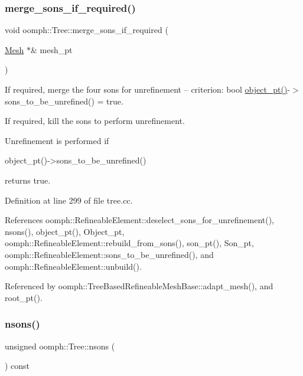 \subsubsection{\texorpdfstring{merge\+\_\+sons\+\_\+if\+\_\+required()}{merge\_sons\_if\_required()}}
{\footnotesize\ttfamily void oomph\+::\+Tree\+::merge\+\_\+sons\+\_\+if\+\_\+required (\begin{DoxyParamCaption}\item[{\hyperlink{classoomph_1_1Mesh}{Mesh} $\ast$\&}]{mesh\+\_\+pt }\end{DoxyParamCaption})}



If required, merge the four sons for unrefinement -- criterion\+: bool \hyperlink{classoomph_1_1Tree_a2f2eeb0f1dd161f696cccc652974ff4c}{object\+\_\+pt()}-\/$>$ sons\+\_\+to\+\_\+be\+\_\+unrefined() = true. 

If required, kill the sons to perform unrefinement.

Unrefinement is performed if \begin{DoxyVerb} object_pt()->sons_to_be_unrefined()
\end{DoxyVerb}


returns true. 

Definition at line 299 of file tree.\+cc.



References oomph\+::\+Refineable\+Element\+::deselect\+\_\+sons\+\_\+for\+\_\+unrefinement(), nsons(), object\+\_\+pt(), Object\+\_\+pt, oomph\+::\+Refineable\+Element\+::rebuild\+\_\+from\+\_\+sons(), son\+\_\+pt(), Son\+\_\+pt, oomph\+::\+Refineable\+Element\+::sons\+\_\+to\+\_\+be\+\_\+unrefined(), and oomph\+::\+Refineable\+Element\+::unbuild().



Referenced by oomph\+::\+Tree\+Based\+Refineable\+Mesh\+Base\+::adapt\+\_\+mesh(), and root\+\_\+pt().

\mbox{\label{classoomph_1_1Tree_a31e4123b40f6fb52d180a154c9123e85}} 
\subsubsection{\texorpdfstring{nsons()}{nsons()}}
{\footnotesize\ttfamily unsigned oomph\+::\+Tree\+::nsons (\begin{DoxyParamCaption}{ }\end{DoxyParamCaption}) const\hspace{0.3cm}{\ttfamily [inline]}}



